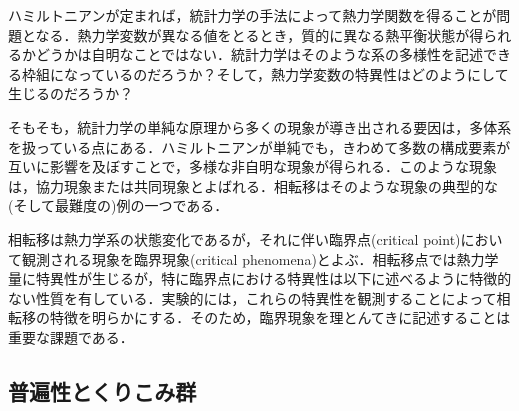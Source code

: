 \documentclass[a4paper,11pt]{jsarticle}
\begin{document}
ハミルトニアンが定まれば，統計力学の手法によって熱力学関数を得ることが問題となる．熱力学変数が異なる値をとるとき，質的に異なる熱平衡状態が得られるかどうかは自明なことではない．統計力学はそのような系の多様性を記述できる枠組になっているのだろうか？そして，熱力学変数の特異性はどのようにして生じるのだろうか？\par
そもそも，統計力学の単純な原理から多くの現象が導き出される要因は，多体系を扱っている点にある．ハミルトニアンが単純でも，きわめて多数の構成要素が互いに影響を及ぼすことで，多様な非自明な現象が得られる．このような現象は，協力現象または共同現象とよばれる．相転移はそのような現象の典型的な(そして最難度の)例の一つである．\par
相転移は熱力学系の状態変化であるが，それに伴い臨界点(critical point)において観測される現象を臨界現象(critical phenomena)とよぶ．相転移点では熱力学量に特異性が生じるが，特に臨界点における特異性は以下に述べるように特徴的ない性質を有している．実験的には，これらの特異性を観測することによって相転移の特徴を明らかにする．そのため，臨界現象を理とんてきに記述することは重要な課題である．

\subsection{普遍性とくりこみ群}
\end{document}
